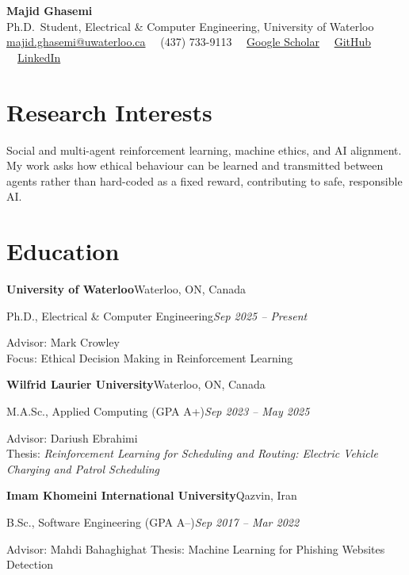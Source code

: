 \documentclass[letterpaper,11pt]{article}
\newcommand{\role}[2]{\textbf{#1}\hfill{#2}\par}
\newcommand{\sub}[2]{#1\hfill\textit{#2}\par}
\newcommand{\gap}{\vspace{0.7em}}
\begin{document}
\begin{center}
  {\LARGE\bfseries Majid Ghasemi}\\[0.45em]
  {\footnotesize
   Ph.D.\ Student, Electrical \& Computer Engineering, University of Waterloo\\[0.35em]
   \href{mailto:majid.ghasemi@uwaterloo.ca}{majid.ghasemi@uwaterloo.ca}
   \ \textperiodcentered\
   (437) 733-9113
   \ \textperiodcentered\
   \href{https://scholar.google.com/citations?user=cHOAJEgAAAAJ&hl=en}{Google Scholar}
   \ \textperiodcentered\
   \href{https://github.com/majidghassemi}{GitHub}
   \ \textperiodcentered\
   \href{https://www.linkedin.com/in/majiddghasemi/}{LinkedIn}
  }
\end{center}
\vspace{0.5em}

\section{Research Interests}
Social and multi-agent reinforcement learning, machine ethics, and AI alignment. My work asks how
ethical behaviour can be learned and transmitted between agents rather than hard-coded as a fixed reward, contributing to safe, responsible AI.

\section{Education}

\role{University of Waterloo}{Waterloo, ON, Canada}
\sub{Ph.D., Electrical \& Computer Engineering}{Sep 2025 -- Present}
Advisor: Mark Crowley\\
Focus: Ethical Decision Making in Reinforcement Learning
\gap

\role{Wilfrid Laurier University}{Waterloo, ON, Canada}
\sub{M.A.Sc., Applied Computing (GPA A+)}{Sep 2023 -- May 2025}
Advisor: Dariush Ebrahimi\\
Thesis: \textit{Reinforcement Learning for Scheduling and Routing: Electric Vehicle Charging and Patrol Scheduling}
\gap

\role{Imam Khomeini International University}{Qazvin, Iran}
\sub{B.Sc., Software Engineering (GPA A--)}{Sep 2017 -- Mar 2022}
Advisor: Mahdi Bahaghighat
Thesis: Machine Learning for Phishing Websites Detection
\end{document}
